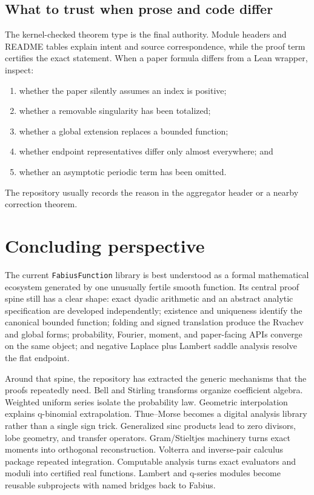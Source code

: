 \documentclass[11pt,oneside]{report}
\theoremstyle{definition}
\theoremstyle{remark}
\begin{document}
\section{What to trust when prose and code differ}
The kernel-checked theorem type is the final authority.  Module headers and README tables explain intent and source correspondence, while the proof term certifies the exact statement.  When a paper formula differs from a Lean wrapper, inspect:
\begin{enumerate}
  \item whether the paper silently assumes an index is positive;
  \item whether a removable singularity has been totalized;
  \item whether a global extension replaces a bounded function;
  \item whether endpoint representatives differ only almost everywhere; and
  \item whether an asymptotic periodic term has been omitted.
\end{enumerate}
The repository usually records the reason in the aggregator header or a nearby correction theorem.

\chapter{Concluding perspective}
The current \texttt{FabiusFunction} library is best understood as a formal
mathematical ecosystem generated by one unusually fertile smooth function.  Its
central proof spine still has a clear shape: exact dyadic arithmetic and an
abstract analytic specification are developed independently; existence and
uniqueness identify the canonical bounded function; folding and signed
translation produce the Rvachev and global forms; probability, Fourier,
moment, and paper-facing APIs converge on the same object; and negative
Laplace plus Lambert saddle analysis resolve the flat endpoint.

Around that spine, the repository has extracted the generic mechanisms that the
proofs repeatedly need.  Bell and Stirling transforms organize coefficient
algebra.  Weighted uniform series isolate the probability law.  Geometric
interpolation explains q-binomial extrapolation.  Thue--Morse becomes a digital
analysis library rather than a single sign trick.  Generalized sinc products
lead to zero divisors, lobe geometry, and transfer operators.  Gram/Stieltjes
machinery turns exact moments into orthogonal reconstruction.  Volterra and
inverse-pair calculus package repeated integration.  Computable analysis turns
exact evaluators and moduli into certified real functions.  Lambert and q-series
modules become reusable subprojects with named bridges back to Fabius.
\end{document}
